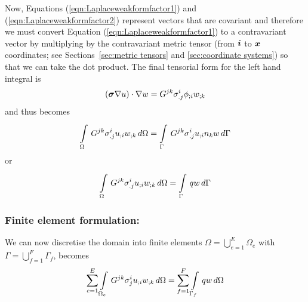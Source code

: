 Now, Equations (\ref{eqn:Laplaceweakformfactor1}) and (\ref{eqn:Laplaceweakformfactor2})
represent vectors that are covariant and therefore we must convert Equation
(\ref{eqn:Laplaceweakformfactor1}) to a contravariant vector by 
multiplying by the contravariant metric tensor (from $\vect{i}$ to $\vect{x}$ 
coordinates; see Sections~\ref{sec:metric tensors} and \ref{sec:coordinate systems})
so that we can take the dot product. The final tensorial form for the left
hand integral is
\begin{equation}
  \left( \boldsymbol{\sigma}\nabla u \right)\cdot\nabla w = 
  G^{jk}\sigma^{i}_{.j} {\phi}_{;i}  {w}_{;k} 
\end{equation}
and thus  becomes
\begin{equation}
    \displaystyle\int\limits_{\Omega}^{} \,G^{jk}\sigma^{i}_{.j} {u}_{;i}  {w}_{;k} \,d\Omega 
  =   \displaystyle\int\limits_{\Gamma}^{} \,G^{jk}\sigma^{i}_{.j} {u}_{;i} n_{k}w\,d\Gamma 
  \label{eqn:Laplaceweightedresidualtensorform1}
\end{equation}
or
\begin{equation}
    \displaystyle\int\limits_{\Omega}^{} \,G^{jk}\sigma^{i}_{.j} {u}_{;i}  {w}_{;k} \,d\Omega 
  =   \displaystyle\int\limits_{\Gamma}^{} \,qw\,d\Gamma 
  \label{eqn:Laplaceweightedresidualtensorform2}
\end{equation}

\subsubsection{Finite element formulation:}

We can now discretise the domain into finite elements \ie $\Omega=
\displaystyle{\bigcup_{e=1}^{E}}\Omega_{e}$ with
$\Gamma=\displaystyle{\bigcup_{f=1}^{F}}\Gamma_{f}$, 
 becomes
\begin{equation}
  \displaystyle\sum_{e=1}^{E}  \displaystyle\int\limits_{\Omega_{e}}^{} \,G^{jk}\sigma^{i}_{j} {u}_{;i}  {w}_{;k} \,d\Omega 
  =\displaystyle\sum_{f=1}^{F}  \displaystyle\int\limits_{\Gamma_{f}}^{} \,qw\,d\Omega 
\end{equation}

